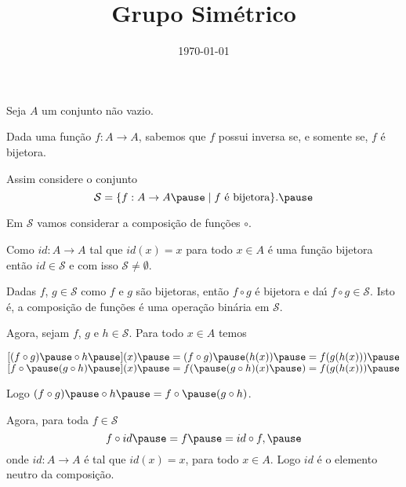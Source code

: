 \documentclass{beamer}
\title{Grupo Sim\'etrico}
\author[\autor]{\autor}
\institute[\instituto]{\instituto}
\date{\today}
\begin{document}
    \begin{frame}
        \maketitle
    \end{frame}


    \begin{frame}
        Seja $A$ um conjunto n\~ao vazio.\pause

        \vspace{.3cm}

        Dada uma fun\c{c}\~ao $f : A \to A$, sabemos que $f$ possui inversa \pause se, e somente se, $f$ \'e bijetora.\pause

        \vspace{.3cm}

        Assim considere o conjunto\pause
        \[
            \mathcal{S} = \{ f : A \to A \pause \mid f \mbox{ \'e bijetora}\}.\pause
        \]

        Em $\mathcal{S}$ vamos considerar a composi\c{c}\~ao de fun\c{c}\~oes $\circ$.\pause

        \vspace{.3cm}

        Como $id : A \to A$ tal que $id(x) = x$ para todo $x \in A$ \pause \'e uma fun\c{c}\~ao bijetora \pause ent\~ao $id \in \mathcal{S}$ \pause e com isso $\mathcal{S} \ne \emptyset$.
    \end{frame}

    \begin{frame}
        Dadas $f$, $g \in \mathcal{S}$ \pause como $f$ e $g$ s\~ao bijetoras, \pause ent\~ao $f \circ g$ é bijetora \pause e da{\'\i} $f \circ g \in \mathcal{S}$. \pause Isto \'e, \pause a composi\c{c}\~ao de fun\c{c}\~oes \pause \'e uma opera\c{c}\~ao bin\'aria em $\mathcal{S}$.

        \vspace{.3cm}

        Agora, sejam $f$, $g$ e $h \in \mathcal{S}$. \pause Para todo $x \in A$ temos\pause
        \begin{center}
            $[(f\circ g) \pause \circ h \pause](x) \pause = (f \circ g) \pause(h(x)) \pause = f(g(h(x))) \pause$\\
            $[f\circ \pause(g\circ h) \pause](x) \pause = f( \pause(g\circ h)(x) \pause) = f(g(h(x))) \pause$
        \end{center}

        Logo $(f\circ g) \pause \circ h  \pause = f\circ \pause (g\circ h)$. \pause

        \vspace{.3cm}

        Agora, para toda $f \in \mathcal{S}$\pause
        \[
            f\circ id  \pause = f  \pause = id\circ f, \pause
        \]
        onde $id : A \to A$ \pause \'e tal que $id(x) = x$, \pause para todo $x \in A$. \pause Logo $id$ \'e o elemento neutro da composi\c{c}\~ao.\pause

    \end{frame}
\end{document}
